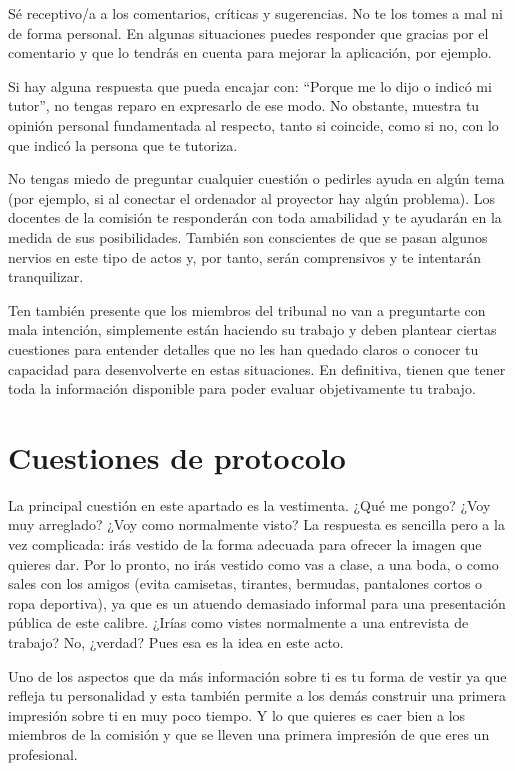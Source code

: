 Sé receptivo/a a los comentarios, críticas y sugerencias. No te los tomes a mal ni de forma personal. En algunas situaciones puedes responder que gracias por el comentario y que lo tendrás en cuenta para mejorar la aplicación, por ejemplo. 


Si hay alguna respuesta que pueda encajar con:  ``Porque me lo dijo o indicó mi tutor'', no tengas reparo en expresarlo de ese modo. No obstante, muestra tu opinión personal fundamentada al respecto, tanto si coincide, como si no, con lo que indicó la persona que te tutoriza. 

No tengas miedo de preguntar cualquier cuestión o pedirles ayuda en algún tema (por ejemplo, si al conectar el ordenador al proyector hay algún problema). Los docentes de la comisión te responderán con toda amabilidad y te ayudarán en la medida de sus posibilidades. También son conscientes de que se pasan algunos nervios en este tipo de actos y, por tanto, serán comprensivos y te intentarán tranquilizar.

Ten también presente que los miembros del tribunal no van a preguntarte con mala intención, simplemente están haciendo su trabajo y deben plantear ciertas cuestiones para entender detalles que no les han quedado claros o conocer tu capacidad para desenvolverte en estas situaciones. En definitiva, tienen que tener toda la información disponible para poder evaluar objetivamente tu trabajo.

\section{Cuestiones de protocolo}

La principal cuestión en este apartado es la vestimenta. ¿Qué me pongo? ¿Voy muy arreglado? ¿Voy como normalmente visto? La respuesta es sencilla pero a la vez complicada: irás vestido de la forma adecuada para ofrecer la imagen que quieres dar. Por lo pronto, no irás vestido como vas a clase, a una boda, o como sales con los amigos (evita camisetas, tirantes, bermudas, pantalones cortos o ropa deportiva), ya que es un atuendo demasiado informal para una presentación pública de este calibre. ¿Irías como vistes normalmente a una entrevista de trabajo? No, ¿verdad? Pues esa es la idea en este acto. 

Uno de los aspectos que da más información sobre ti es tu forma de vestir ya que refleja tu personalidad y esta también permite a los demás construir una primera impresión sobre ti en muy poco tiempo. Y lo que quieres es caer bien a los miembros de la comisión y que se lleven una primera impresión de que eres un profesional.

